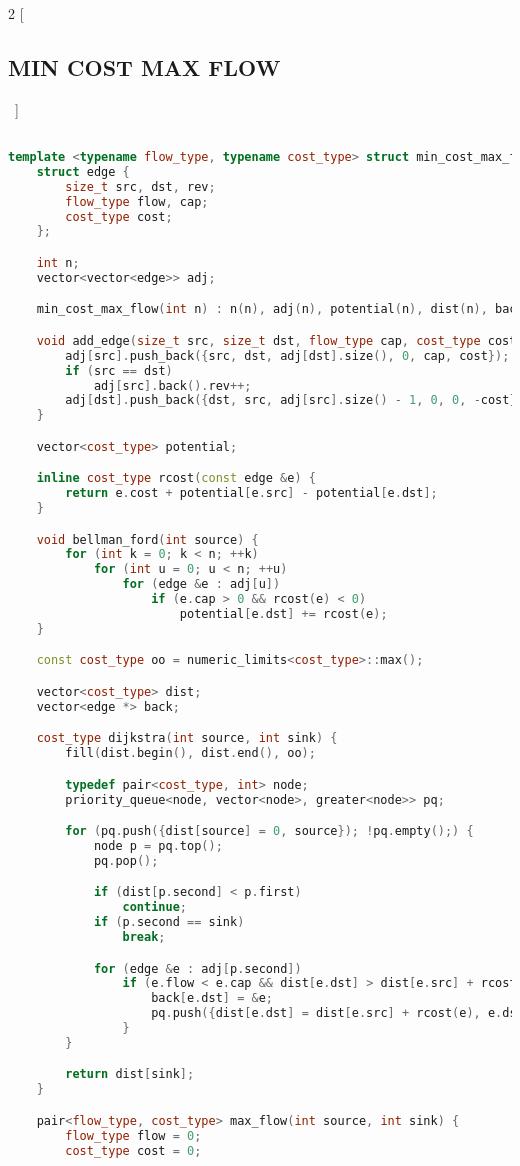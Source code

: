 \documentclass[leter]{amsart}
\begin{document}
\begin{multicols}{2}
[\subsection{MIN COST MAX FLOW}\ ]
\begin{lstlisting}[language=C++]

template <typename flow_type, typename cost_type> struct min_cost_max_flow {
	struct edge {
		size_t src, dst, rev;
		flow_type flow, cap;
		cost_type cost;
	};

	int n;
	vector<vector<edge>> adj;

	min_cost_max_flow(int n) : n(n), adj(n), potential(n), dist(n), back(n) {}

	void add_edge(size_t src, size_t dst, flow_type cap, cost_type cost) {
		adj[src].push_back({src, dst, adj[dst].size(), 0, cap, cost});
		if (src == dst)
			adj[src].back().rev++;
		adj[dst].push_back({dst, src, adj[src].size() - 1, 0, 0, -cost});
	}

	vector<cost_type> potential;

	inline cost_type rcost(const edge &e) {
		return e.cost + potential[e.src] - potential[e.dst];
	}

	void bellman_ford(int source) {
		for (int k = 0; k < n; ++k)
			for (int u = 0; u < n; ++u)
				for (edge &e : adj[u])
					if (e.cap > 0 && rcost(e) < 0)
						potential[e.dst] += rcost(e);
	}

	const cost_type oo = numeric_limits<cost_type>::max();

	vector<cost_type> dist;
	vector<edge *> back;

	cost_type dijkstra(int source, int sink) {
		fill(dist.begin(), dist.end(), oo);

		typedef pair<cost_type, int> node;
		priority_queue<node, vector<node>, greater<node>> pq;

		for (pq.push({dist[source] = 0, source}); !pq.empty();) {
			node p = pq.top();
			pq.pop();

			if (dist[p.second] < p.first)
				continue;
			if (p.second == sink)
				break;

			for (edge &e : adj[p.second])
				if (e.flow < e.cap && dist[e.dst] > dist[e.src] + rcost(e)) {
					back[e.dst] = &e;
					pq.push({dist[e.dst] = dist[e.src] + rcost(e), e.dst});
				}
		}

		return dist[sink];
	}

	pair<flow_type, cost_type> max_flow(int source, int sink) {
		flow_type flow = 0;
		cost_type cost = 0;


\end{lstlisting}
\end{multicols}
\end{document}
